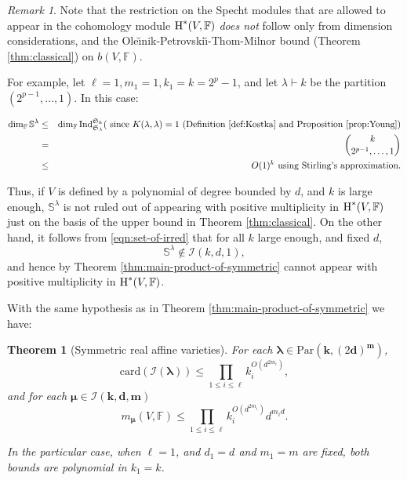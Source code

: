 \documentclass{amsart}
\newtheorem{theorem}{Theorem}
\theoremstyle{definition}
\theoremstyle{remark}
\newtheorem{remark}{Remark}
\numberwithin{equation}{section}
\begin{document}
\begin{remark}
\label{re:restriction-is-non-trivial}
Note that 
the restriction on the Specht modules that are allowed to appear in the cohomology
module ${\mbox{\rm H}}^*(V,{\mathbb{F}})$ \emph{does not} follow only from dimension considerations,
and the Ole{\u\i}nik-Petrovski{\u\i}-Thom-Milnor bound (Theorem \ref{thm:classical}) 
on $b(V,{\mathbb{F}})$.

For example, let $\ell=1,m_1=1,k_1=k = 2^p-1$, and let $\lambda \vdash k$ be the
partition $(2^{p-1},\ldots,1)$. In this case:

\begin{eqnarray*}
\dim_{\mathbb{F}} \mathbb{S}^{\lambda} &\leq & \dim_{\mathbb{F}} {\mathrm{Ind}}_{\mathfrak{S}_\lambda}^{\mathfrak{S}_k} 
(\mbox{ since }  K(\lambda,\lambda)=1 \mbox{ (Definition \ref{def:Kostka} and Proposition \ref{prop:Young}})
  \\
&=&  \binom{k}{2^{p-1},\ldots,1} \\
&\leq & O(1)^k \mbox{ using Stirling's approximation}.
\end{eqnarray*}

Thus, if $V$ is defined by a polynomial of degree bounded by $d$, and $k$ is large enough,
$\mathbb{S}^\lambda$ is not ruled out of appearing with positive multiplicity in 
${\mbox{\rm H}}^*(V,{\mathbb{F}})$ just on the basis of the upper bound in Theorem \ref{thm:classical}.
On the other hand, it follows from \eqref{eqn:set-of-irred} that for all $k$ large enough, 
and fixed $d$, 
\[
\mathbb{S}^\lambda \not\in \mathcal{I}(k,d,1),
\] 
and hence by Theorem \ref{thm:main-product-of-symmetric} 
cannot appear with positive multiplicity in ${\mbox{\rm H}}^*(V,{\mathbb{F}})$. 
\end{remark}

With the same hypothesis as in Theorem \ref{thm:main-product-of-symmetric} we have:

\begin{theorem}[Symmetric real affine varieties]
\label{thm:main-product-of-symmetric-quantitative}
For each $\pmb{\lambda} \in{\mathrm{Par}}({\mathbf{k}}, (2{\mathbf{d}})^{\mathbf{m}})$,
\[
{\mathrm{card}}(\mathcal{I}(\pmb{\lambda})) \leq \prod_{1 \leq i \leq \ell} k_i^{O(d^{2 m_i})},
\]
and for each $\pmb{\mu} \in \mathcal{I}({\mathbf{k}},{\mathbf{d}},{\mathbf{m}})$
\[
m_{\pmb{\mu}}(V,{\mathbb{F}}) \leq
\prod_{1 \leq i \leq \ell} k_i^{O(d^{2 m_i})} d^{m_id}.
\]

In the particular case, when $\ell=1$, and $d_1=d$ and $m_1=m$  are fixed, both bounds are polynomial in $k_1=k$.
\end{theorem}
\end{document}
